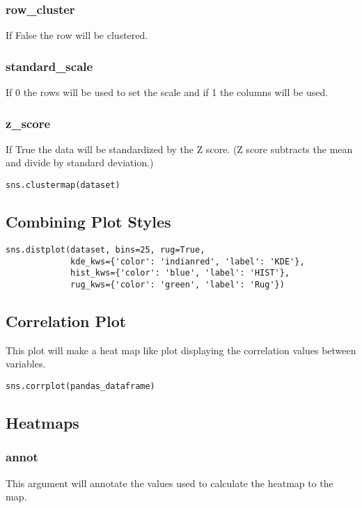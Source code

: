 %
\subsubsection{row\_cluster}
If False the row will {\color{red}{not}} be clustered.

%
\subsubsection{standard\_scale}
If 0 the rows will be used to set the scale and if 1 the columns will be used.

%
\subsubsection{z\_score}
If True the data will be standardized by the Z score. (Z score subtracts the
mean and divide by standard deviation.)

\begin{lstlisting}
sns.clustermap(dataset)
\end{lstlisting}

\subsection{Combining Plot Styles}

\begin{lstlisting}
sns.distplot(dataset, bins=25, rug=True,
             kde_kws={'color': 'indianred', 'label': 'KDE'},
             hist_kws={'color': 'blue', 'label': 'HIST'},
             rug_kws={'color': 'green', 'label': 'Rug'})
\end{lstlisting}

\subsection{Correlation Plot}
This plot will make a heat map like plot displaying the correlation values
between variables.
\begin{lstlisting}
sns.corrplot(pandas_dataframe)
\end{lstlisting}

\subsection{Heatmaps}

%
\subsubsection{annot}
This argument will annotate the values used to calculate the heatmap to the map.

